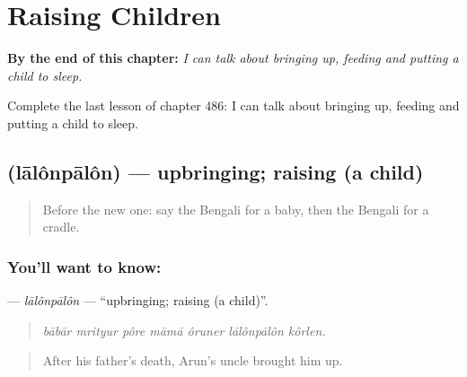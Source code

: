 
\chapter{Raising Children}
\label{ch:bn-raising-children}

\begin{chapteropening}
\textbf{By the end of this chapter:} \emph{I can talk about bringing up, feeding and putting a child to sleep.}

Complete the last lesson of chapter 486: I can talk about bringing up, feeding and putting a child to sleep.
\end{chapteropening}

\section[\texorpdfstring{\bn{লালনপালন} (lālônpālôn)}{লালনপালন (lālônpālôn)}]{ (lālônpālôn) — upbringing; raising (a child)}

\label{lesson:BN-C486-lalonpalon}



\begin{quote}
Before the new one: say the Bengali for a baby, then the Bengali for a cradle.
\end{quote}

\subsection*{You'll want to know: }
\textbf{} — \emph{lālônpālôn} — \textquotedblleft{}upbringing; raising (a child)\textquotedblright{}.

\begin{quote}
      
\end{quote}

\begin{quote}
\emph{bābār mrityur pôre māmā ôruner lālônpālôn kôrlen.}
\end{quote}

\begin{quote}
After his father's death, Arun's uncle brought him up.
\end{quote}

